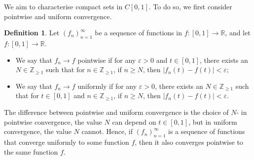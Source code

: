 \documentclass[a4paper, openany]{memoir}
\theoremstyle{definition}
\newtheorem{definition}{Definition}[section]
\theoremstyle{plain}
\begin{document}
    We aim to characterise compact sets in $C[0, 1]$. To do so, we first consider pointwise and uniform convergence.
    \begin{definition}
        Let $(f_n)_{n=1}^\infty$ be a sequence of functions in $f \colon [0, 1] \to \mathbb{R}$, and let $f \colon [0, 1] \to \mathbb{R}$. 
        \begin{itemize}
            \item We say that $f_n \to f$ pointwise if for any $\varepsilon > 0$ and $t \in [0, 1]$, there exists an $N \in \mathbb{Z}_{\geq 1}$ such that for $n \in \mathbb{Z}_{\geq 1}$, if $n \geq N$, then $|f_n(t) - f(t)| < \varepsilon$;
            \item We say that $f_n \to f$ uniformly if for any $\varepsilon > 0$, there exists an $N \in \mathbb{Z}_{\geq 1}$ such that for $t \in [0, 1]$ and $n \in \mathbb{Z}_{\geq 1}$, if $n \geq N$, then $|f_n(t) - f(t)| < \varepsilon$.
        \end{itemize}
    \end{definition}
    \noindent The difference between pointwise and uniform convergence is the choice of $N$- in pointwise convergence, the value $N$ can depend on $t \in [0, 1]$, but in uniform convergence, the value $N$ cannot. Hence, if $(f_n)_{n=1}^\infty$ is a sequence of functions that converge uniformly to some function $f$, then it also converges pointwise to the same function $f$.
\end{document}
